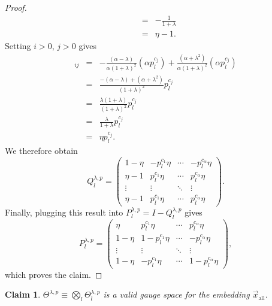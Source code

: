 \documentclass{article}
\numberwithin{myclaim}{section}
\newtheorem{claim}{Claim}
\begin{document}
\begin{proof}
\begin{eqnarray}
    &=& - \frac{1}{1 + \lambda} \\
    &=& \eta - 1.    
\end{eqnarray}
Setting $i>0$, $j>0$ gives
\begin{eqnarray}
    [Q_l^{\lambda,p}]_{ij} &=& - \frac{(\alpha - \lambda)}{\alpha(1+\lambda)^2} (\alpha p_l^{c_j})  + \frac{(\alpha + \lambda^2)}{\alpha(1+\lambda)^2} (\alpha p_l^{c_j}) \\
    &=& \frac{-(\alpha - \lambda) + (\alpha + \lambda^2)}{(1+\lambda)^2} p_l^{c_j} \\
    &=& \frac{\lambda(1 + \lambda)}{(1+\lambda)^2} p_l^{c_j} \\
    &=& \frac{\lambda}{1 + \lambda} p_l^{c_j} \\
    &=& \eta p_l^{c_j}.   
\end{eqnarray}
We therefore obtain
\begin{equation}
 Q_l^{\lambda,p} =  
    \left( 
    \begin{array}{cccc} 
        1 - \eta & -p_l^{c_1} \eta & \cdots & -p_l^{c_\alpha} \eta \\
        \eta - 1 & p_l^{c_1} \eta & \cdots &  p_l^{c_\alpha} \eta \\
        \vdots & \vdots & \ddots & \vdots \\
        \eta - 1 & p_l^{c_1} \eta & \cdots & p_l^{c_\alpha} \eta 
    \end{array} \right).
\end{equation}  
Finally, plugging this result into $P_l^{\lambda,p} = I - Q_l^{\lambda,p}$ gives
\begin{equation}
    P_l^{\lambda,p} =  \left( 
    \begin{array}{cccc} 
        \eta & p_l^{c_1} \eta & \cdots & p_l^{c_\alpha} \eta \\
        1-\eta & 1-p_l^{c_1} \eta & \cdots &  -p_l^{c_\alpha} \eta \\
        \vdots & \vdots & \ddots & \vdots \\
        1-\eta & -p_l^{c_1} \eta & \cdots & 1-p_l^{c_\alpha} \eta 
    \end{array} \right),
\end{equation}
which proves the claim. 
\end{proof}


\begin{claim}
$\Theta^{\lambda,p} \equiv \bigotimes_l \Theta^{\lambda,p}_l$ is a valid gauge space for the embedding $\vec{x}_\mathrm{all}$.
\end{claim}
\end{document}
